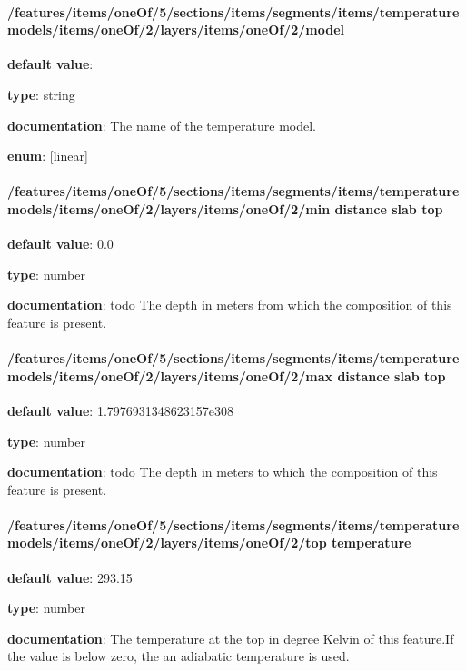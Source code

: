 \paragraph{/features/items/oneOf/5/sections/items/segments/items/temperature models/items/oneOf/2/layers/items/oneOf/2/model} \begin{itemized}
\item {\bf default value}: 
\item {\bf type}: string
\item {\bf documentation}: The name of the temperature model.
\item {\bf enum}: [linear]\end{itemized}\paragraph{/features/items/oneOf/5/sections/items/segments/items/temperature models/items/oneOf/2/layers/items/oneOf/2/min distance slab top} \begin{itemized}
\item {\bf default value}: 0.0
\item {\bf type}: number
\item {\bf documentation}: todo The depth in meters from which the composition of this feature is present.
\end{itemized}\paragraph{/features/items/oneOf/5/sections/items/segments/items/temperature models/items/oneOf/2/layers/items/oneOf/2/max distance slab top} \begin{itemized}
\item {\bf default value}: 1.7976931348623157e308
\item {\bf type}: number
\item {\bf documentation}: todo The depth in meters to which the composition of this feature is present.
\end{itemized}\paragraph{/features/items/oneOf/5/sections/items/segments/items/temperature models/items/oneOf/2/layers/items/oneOf/2/top temperature} \begin{itemized}
\item {\bf default value}: 293.15
\item {\bf type}: number
\item {\bf documentation}: The temperature at the top in degree Kelvin of this feature.If the value is below zero, the an adiabatic temperature is used.

\end{itemized}
